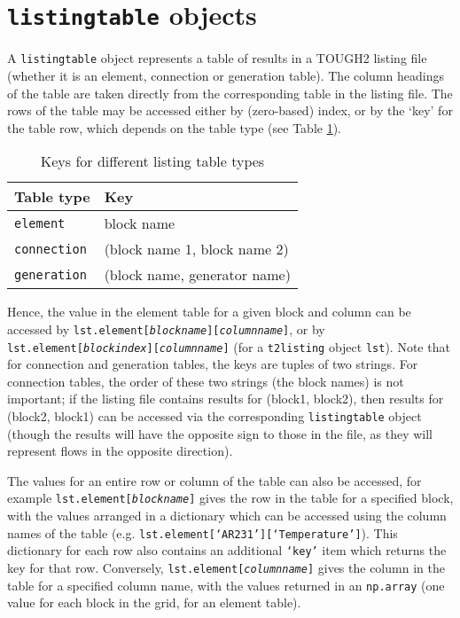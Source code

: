 \section{\texttt{listingtable} objects}
\label{listingtable}

A \texttt{listingtable} object represents a table of results in a TOUGH2 listing file (whether it is an element, connection or generation table).  The column headings of the table are taken directly from the corresponding table in the listing file.  The rows of the table may be accessed either by (zero-based) index, or by the `key' for the table row, which depends on the table type (see Table \ref{tb:listing_table_keys}).

\begin{table}[h]
  \begin{center}
    \begin{tabular}{|l|l|}
      \hline
      \textbf{Table type} & \textbf{Key}\\
      \hline
      \texttt{element} & block name\\
      \texttt{connection} & (block name 1, block name 2)\\
      \texttt{generation} & (block name, generator name)\\
      \hline
    \end{tabular}
    \caption{Keys for different listing table types}
    \label{tb:listing_table_keys}
  \end{center}
\end{table}

Hence, the value in the element table for a given block and column can be accessed by \texttt{lst.element[\emph{blockname}][\emph{columnname}]}, or by \texttt{lst.element[\emph{blockindex}][\emph{columnname}]} (for a \texttt{t2listing} object \texttt{lst}).  Note that for connection and generation tables, the keys are tuples of two strings.  For connection tables, the order of these two strings (the block names) is not important; if the listing file contains results for (block1, block2), then results for (block2, block1) can be accessed via the corresponding \texttt{listingtable} object (though the results will have the opposite sign to those in the file, as they will represent flows in the opposite direction).

The values for an entire row or column of the table can also be accessed, for example \texttt{lst.element[\emph{blockname}]} gives the row in the table for a specified block, with the values arranged in a dictionary which can be accessed using the column names of the table (e.g. \texttt{lst.element[`AR231'][`Temperature']}).  This dictionary for each row also contains an additional \texttt{`key'} item which returns the key for that row.  Conversely, \texttt{lst.element[\emph{columnname}]} gives the column in the table for a specified column name, with the values returned in an \texttt{np.array} (one value for each block in the grid, for an element table).

